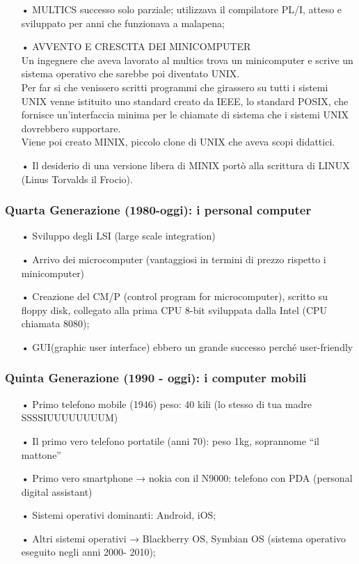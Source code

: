 \documentclass{article}
\begin{document}
\begin{enumerate}
   \item[•] MULTICS successo solo parziale; utilizzava il compilatore PL/I, atteso e sviluppato per anni che funzionava a malapena;
   \item[•] AVVENTO E CRESCITA DEI MINICOMPUTER\\
            Un ingegnere che aveva lavorato al multics trova un minicomputer e scrive un sistema operativo che sarebbe poi diventato UNIX.
            \\Per far si che venissero scritti programmi che girassero su tutti i sistemi UNIX venne istituito uno standard creato da IEEE, lo standard POSIX, che fornisce un'interfaccia minima per le chiamate di sistema che i sistemi UNIX dovrebbero supportare.
            \\Viene poi creato MINIX, piccolo clone di UNIX che aveva scopi didattici.
   \item[•] Il desiderio di una versione libera di MINIX portò alla scrittura di LINUX (Linus Torvalds il Frocio).
\end{enumerate}

\subsubsection{Quarta Generazione (1980-oggi): i personal computer}
\begin{enumerate}
   \item[•] Sviluppo degli LSI (large scale integration)
   \item[•] Arrivo dei microcomputer (vantaggiosi in termini di prezzo rispetto i minicomputer)
   \item[•] Creazione del CM/P (control program for microcomputer), scritto su floppy disk, collegato alla prima CPU 8-bit sviluppata dalla Intel (CPU chiamata 8080);
   \item[•] GUI(graphic user interface) ebbero un grande successo perché user-friendly
\end{enumerate}

\subsubsection{Quinta Generazione (1990 - oggi): i computer mobili}
\begin{enumerate}
   \item[•] Primo telefono mobile (1946) peso: 40 kili (lo stesso di tua madre SSSSIUUUUUUUUM)
   \item[•] Il primo vero telefono portatile (anni 70): peso 1kg, soprannome “il mattone”
   \item[•] Primo vero smartphone → nokia con il N9000: telefono con PDA (personal digital assistant) 
   \item[•] Sistemi operativi dominanti: Android, iOS;
   \item[•] Altri sistemi operativi → Blackberry OS, Symbian OS (sistema operativo eseguito negli anni 2000- 2010);
\end{enumerate}
\end{document}
